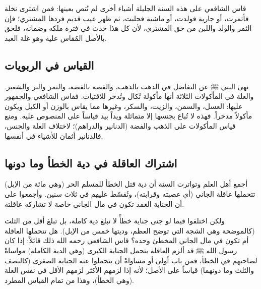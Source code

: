 قاس الشافعي على هذه السنة الجليلة أشياء أخرى لم تُنص بعينها:
فمن اشترى نخلة فأثمرت، أو جارية فولدت، أو ماشية فحلبت، ثم ظهر عيب قديم فردها المشتري؛ فإن الثمر والولد واللبن من حق المشتري، لأن كل هذا حدث في فترة ملكه وضمانه، فلحق بالأصل المُقاس عليه وهو غلة العبد.

\subsection{القياس في الربويات}
نهى النبي ﷺ عن التفاضل في الذهب بالذهب، والفضة بالفضة، والتمر والبر والشعير. 
والعلة في المأكولات الثلاثة أنها مأكولة تُكال وتُدخر للاقتيات. فقاس الشافعي والجمهور عليها: العسل، والسمن، والزيت، والسكر، وغيرها مما يقاس بالوزن أو الكيل ويكون مأكولاً مدخراً. فهذه لا تُباع بجنسها إلا متماثلة ويداً بيد قياساً على المنصوص عليه. ومنع قياس المأكولات على الذهب والفضة (الدنانير والدراهم)؛ لاختلاف العلة والجنس، فالدنانير أثمان للأشياء في أنفسها.

\subsection{اشتراك العاقلة في دية الخطأ وما دونها}
أجمع أهل العلم وتواترت السنة أن دية قتل الخطأ للمسلم الحر (وهي مائة من الإبل) تتحملها عاقلة الجاني (أي عصبته وقرابته)، وتُقسّط عليهم في ثلاث سنين.
وأجمعوا على أن الجناية العمد تكون في مال الجاني خاصة لا تشاركه عاقلته.

ولكن اختلفوا فيما لو جنى جناية خطأً لا تبلغ دية كاملة، بل تبلغ أقل من الثلث (كالموضحة وهي الشجة التي توضح العظم، وديتها خمس من الإبل). هل تتحملها العاقلة أم تكون في مال الجاني المخطئ وحده؟
قاس الشافعي رحمه الله ذلك قائلاً: إذا كان رسول الله ﷺ قد ألزم العاقلة بتحمل الجناية الكبرى (وهي الدية الكاملة) مواساةً لصاحبهم في الخطأ، فمن باب أولى أو مساواةً أن يتحملوا عنه الجناية الصغرى (كالنصف والثلث وما دونهما) قياساً على الأصل؛ لأنه إذا لزمهم الأكثر لزمهم الأقل في نفس العلة (وهي الخطأ)، وهذا من تمام القياس المطرد.